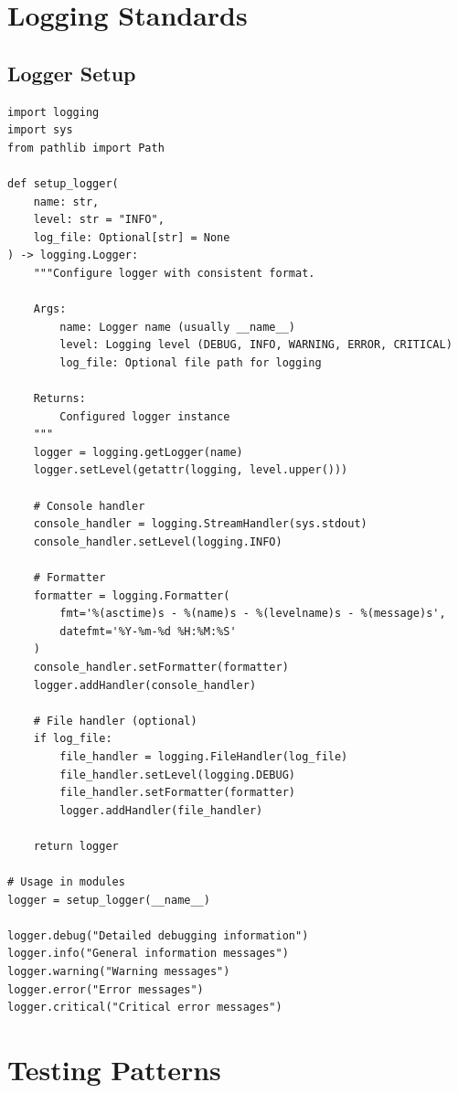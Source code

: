 \section{Logging Standards}

\subsection{Logger Setup}

\begin{lstlisting}[style=python, caption=Logging Configuration]
import logging
import sys
from pathlib import Path

def setup_logger(
    name: str,
    level: str = "INFO",
    log_file: Optional[str] = None
) -> logging.Logger:
    """Configure logger with consistent format.

    Args:
        name: Logger name (usually __name__)
        level: Logging level (DEBUG, INFO, WARNING, ERROR, CRITICAL)
        log_file: Optional file path for logging

    Returns:
        Configured logger instance
    """
    logger = logging.getLogger(name)
    logger.setLevel(getattr(logging, level.upper()))

    # Console handler
    console_handler = logging.StreamHandler(sys.stdout)
    console_handler.setLevel(logging.INFO)

    # Formatter
    formatter = logging.Formatter(
        fmt='%(asctime)s - %(name)s - %(levelname)s - %(message)s',
        datefmt='%Y-%m-%d %H:%M:%S'
    )
    console_handler.setFormatter(formatter)
    logger.addHandler(console_handler)

    # File handler (optional)
    if log_file:
        file_handler = logging.FileHandler(log_file)
        file_handler.setLevel(logging.DEBUG)
        file_handler.setFormatter(formatter)
        logger.addHandler(file_handler)

    return logger

# Usage in modules
logger = setup_logger(__name__)

logger.debug("Detailed debugging information")
logger.info("General information messages")
logger.warning("Warning messages")
logger.error("Error messages")
logger.critical("Critical error messages")
\end{lstlisting}

\section{Testing Patterns}

